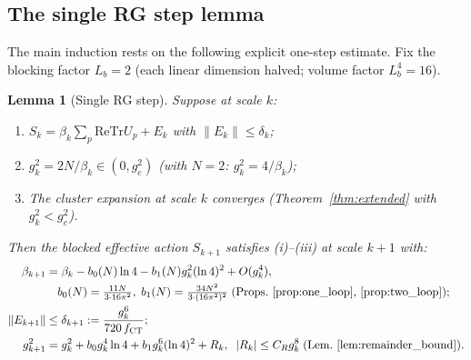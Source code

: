 \documentclass[11pt,a4paper]{amsart}
\newtheorem{lemma}[theorem]{Lemma}
\theoremstyle{definition}
\newcommand{\re}{\mathrm{Re}}
\newcommand{\Tr}{\mathrm{Tr}}
\newcommand{\norm}[1]{\left\|#1\right\|}
\newcommand{\gB}{g^2_c}
\newcommand{\CT}{\mathrm{CT}}
\begin{document}
\subsection{The single RG step lemma}
\label{sec:RG_step}

The main induction rests on the following explicit one-step estimate.
Fix the blocking factor $L_b = 2$ (each linear dimension halved; volume factor $L_b^4 = 16$).

\begin{lemma}[Single RG step]
\label{lem:RG_step}
Suppose at scale $k$:
\begin{enumerate}[label=(\roman*)]
\item\label{itm:step_action}
      $S_k = \beta_k \sum_p \re\Tr U_p + E_k$ with $\norm{E_k} \le \delta_k$;
\item\label{itm:step_coup}
      $g^2_k = 2N/\beta_k \in (0,\gB)$ (with $N=2$: $g^2_k = 4/\beta_k$);
\item\label{itm:step_conv}
      The cluster expansion at scale $k$ converges
      (Theorem~\ref{thm:extended} with $g^2_k < \gB$).
\end{enumerate}
Then the blocked effective action $S_{k+1}$ satisfies
\textup{(i)--(iii)} at scale $k+1$ with:
\begin{align}
  \beta_{k+1} &= \beta_k - b_0(N) \ln 4 - b_1(N) g^2_k (\ln 4)^2 + O(g^4_k),
  \label{eq:beta_run}\\
  &\quad b_0(N) = \tfrac{11N}{3 \cdot 16\pi^2},\;
  b_1(N) = \tfrac{34N^2}{3\cdot(16\pi^2)^2}
  \;\text{(Props.~\ref{prop:one_loop},~\ref{prop:two_loop})}; \notag\\
  \norm{E_{k+1}} &\le \delta_{k+1}
  := \frac{g^6_k}{720\,f_{\CT}}; \label{eq:err_step}\\
  g^2_{k+1} &= g^2_k + b_0 g^4_k \ln 4 + b_1 g^6_k(\ln 4)^2 + R_k,
  \;\; |R_k|\le C_R g^8_k\;\text{(Lem.~\ref{lem:remainder_bound})}. \label{eq:g_step}
\end{align}
\end{lemma}
\end{document}
